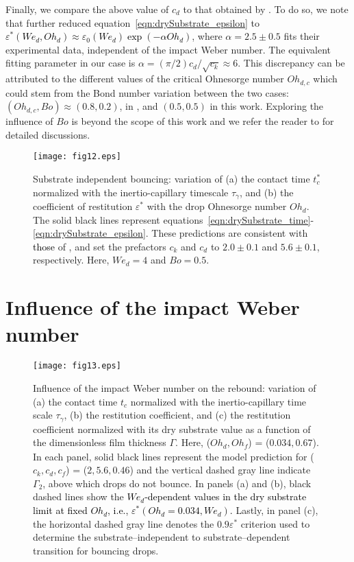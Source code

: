 \documentclass[]{jfm}
\newcommand{\revRev}[1]{\textcolor{black}{#1}}
\newcommand{\Ohd}{\mathit{Oh}_\mathit{d}}
\newcommand{\Ohf}{\mathit{Oh}_\mathit{f}}
\newcommand{\Wen}{\mathit{We}_\mathit{d}}
\begin{document}
Finally, we compare the above value of $c_d$ to that obtained by \citet{jha2020viscous}.
To do so, we note that \citet{jha2020viscous} further reduced equation~\eqref{eqn:drySubstrate_epsilon} to \revRev{$\varepsilon^*(\Wen, \Ohd) \approx \varepsilon_0(\Wen)\exp\left(-\alpha\Ohd\right)$}, where $\alpha = 2.5 \pm 0.5$ fits their experimental data, independent of the impact Weber number. 
The equivalent fitting parameter in our case is $\alpha = (\pi/2) c_d/\sqrt{c_k} \approx 6$. This discrepancy can be attributed to the different values of the critical Ohnesorge number $Oh_{d,c}$  which could stem from the Bond number variation between the two cases: $(Oh_{d,c}, Bo) \approx (0.8, 0.2)$, in \citet{jha2020viscous}, and $(0.5, 0.5)$ in this work. 
Exploring the influence of $Bo$ is beyond the scope of this work and we refer the reader to \citet{vatsalInProgress} for detailed discussions.

\begin{figure}
	\centering
	\texttt{[image: fig12.eps]}
	\caption{Substrate independent bouncing: variation of (a) the contact time $t_c^*$ normalized with the inertio-capillary timescale $\tau_\gamma$, and (b) the coefficient of restitution $\varepsilon^*$ with the drop Ohnesorge number $\Ohd$. The solid black lines represent equations~\eqref{eqn:drySubstrate_time}-\eqref{eqn:drySubstrate_epsilon}. These predictions are consistent with \revRev{those} of \citet{jha2020viscous}, and set the prefactors $c_{k}$ and $c_{d}$ to $2.0 \pm 0.1$ and $5.6 \pm 0.1$, respectively. Here, $\Wen = 4$ and $Bo = 0.5$.}
	\label{fig:appendix_drylimit_figure}
\end{figure}

\section{Influence of the impact Weber number}
\label{sec:weber_influence}

\begin{figure}
	\centering
	\texttt{[image: fig13.eps]}
	\caption{Influence of the impact Weber number on the rebound: variation of (a) the contact time $t_c$ normalized with the inertio-capillary time scale $\tau_\gamma$, (b) the restitution coefficient, and (c) the restitution coefficient normalized with its dry substrate value as a function of the dimensionless film thickness $\Gamma$. 
		Here, ($\Ohd, \Ohf$) = ($0.034, 0.67$). 
		In each panel, solid black lines represent the model prediction for ($c_k, c_d, c_f$) = ($2, 5.6, 0.46$) and the vertical dashed gray line indicate $\Gamma_2$, above which drops do not bounce. 
		In panels (a) and (b), black dashed lines show the \revRev{$\Wen$-dependent values in the dry substrate limit at fixed $\Ohd$, i.e., $\varepsilon^*(\Ohd = 0.034, \Wen)$.}
		Lastly, in panel (c), the horizontal dashed gray line denotes the $0.9\varepsilon^*$ criterion used to determine the substrate--independent to substrate--dependent transition for bouncing drops.}
	\label{fig:appendix_WeberVariation}
\end{figure}
\end{document}
